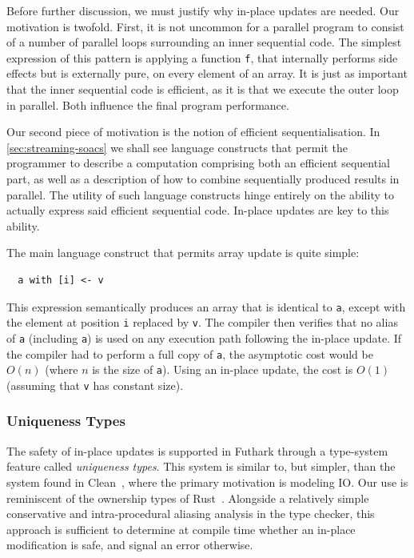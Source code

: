 Before further discussion, we must justify why in-place updates are
needed.  Our motivation is twofold.  First, it is not uncommon for a
parallel program to consist of a number of parallel loops surrounding
an inner sequential code.  The simplest expression of this pattern is
applying a function \lstinline{f}, that internally performs side
effects but is externally pure, on every element of an array.  It is
just as important that the inner sequential code is efficient, as it
is that we execute the outer loop in parallel.  Both influence the
final program performance.

Our second piece of motivation is the notion of efficient
sequentialisation.  In \cref{sec:streaming-soacs} we shall see
language constructs that permit the programmer to describe a
computation comprising both an efficient sequential part, as well as a
description of how to combine sequentially produced results in
parallel.  The utility of such language constructs hinge entirely on
the ability to actually express said efficient sequential code.
In-place updates are key to this ability.

The main language construct that permits array update is quite simple:

\begin{lstlisting}
  a with [i] <- v
\end{lstlisting}

This expression semantically produces an array that is identical to
\lstinline{a}, except with the element at position \lstinline{i}
replaced by \lstinline{v}.  The compiler then verifies that no alias
of \lstinline{a} (including \lstinline{a}) is used on any execution
path following the in-place update.  If the compiler had to perform a
full copy of \lstinline{a}, the asymptotic cost would be $O(n)$ (where
$n$ is the size of \lstinline{a}).  Using an in-place update, the cost
is $O(1)$ (assuming that \lstinline{v} has constant size).

\subsubsection{Uniqueness Types}

The safety of in-place updates is supported in Futhark through a
type-system feature called \textit{uniqueness types}.  This system is
similar to, but simpler, than the system found in
Clean~\cite{clean-uniqueness-types,barendsen1996uniqueness}, where the
primary motivation is modeling IO.  Our use is reminiscent of the
ownership types of Rust~\cite{rust}.  Alongside a relatively simple
conservative and intra-procedural aliasing analysis in the type
checker, this approach is sufficient to determine at compile time
whether an in-place modification is safe, and signal an error
otherwise.

